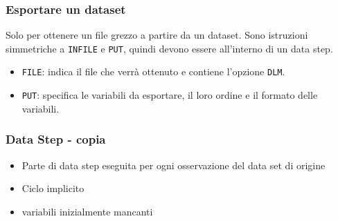 \documentclass[aspectratio=169]{beamer}
\begin{document}
\begin{frame}[containsverbatim]\frametitle{Esportare un dataset}
Solo per ottenere un file grezzo a partire da un dataset.
Sono istruzioni simmetriche a \verb|INFILE| e \verb+PUT+, quindi devono essere
all'interno di un data step.

\begin{itemize}
\item
\verb+FILE+: indica il file che verrà ottenuto e contiene l'opzione \verb+DLM+.
\item
\verb+PUT+: specifica le variabili da esportare, il loro ordine e il formato
    delle variabili.
\end{itemize}
\end{frame}



\begin{frame}[fragile]\frametitle{Data Step - copia }
  \begin{itemize}
  \item
    Parte di data step eseguita per ogni osservazione del data set di origine
  \item
    Ciclo implicito
  \item variabili inizialmente mancanti
  \end{itemize}
\end{frame}





\end{document}
